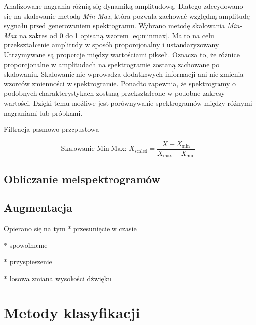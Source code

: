 Analizowane nagrania różnią się dynamiką amplitudową.
Dlatego zdecydowano się na skalowanie metodą \emph{Min-Max}, która pozwala zachować względną amplitudę sygnału przed generowaniem spektrogramu.
Wybrano metodę skalowania \emph{Min-Max} na zakres od 0 do 1 opisaną wzorem \eqref{eq:minmax}.
Ma to na celu przekształcenie amplitudy w sposób proporcjonalny i ustandaryzowany.
Utrzymywane są proporcje między wartościami pikseli.
Oznacza to, że różnice proporcjonalne w amplitudach na spektrogramie zostaną zachowane po skalowaniu.
Skalowanie nie wprowadza dodatkowych informacji ani nie zmienia wzorców zmienności w spektrogramie.
Ponadto zapewnia, że spektrogramy o podobnych charakterystykach zostaną przekształcone w podobne zakresy wartości.
Dzięki temu możliwe jest porównywanie spektrogramów między różnymi nagraniami lub próbkami.

Filtracja pasmowo przepustowa

\begin{equation}
	\label{eq:minmax}
	\text{Skalowanie Min-Max: } X_{\text{scaled}} = \frac{X - X_{\text{min}}}{X_{\text{max}} - X_{\text{min}}}
\end{equation}


\subsection{Obliczanie melspektrogramów}
\label{subsec:melspectrogram}

\subsection{Augmentacja}
\label{subsec:augmentacja}


Opierano się na tym \cite{augmentation}
* przesunięcie w czasie

* spowolnienie

* przyspieszenie

* losowa zmiana wysokości dźwięku

\section{Metody klasyfikacji}
\label{sec:klasyfikacja}

